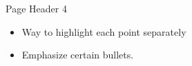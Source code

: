 \documentclass[
  ignorenonframetext,
]{beamer}
\begin{document}
\begin{frame}{Page Header 4}
\label{page-header-4}
\begin{itemize}
    \item<1> Way to highlight each point separately
    \item<2> Emphasize certain bullets. 
  \end{itemize}
\end{frame}
\end{document}

